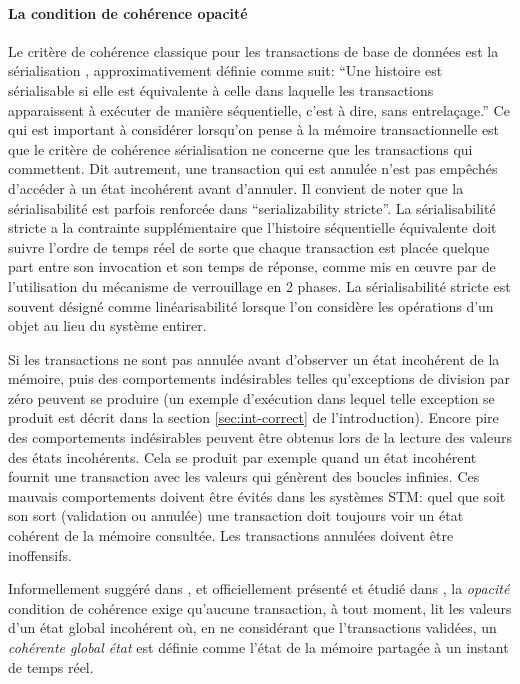 \paragraph {La condition de cohérence opacité}
Le critère de cohérence classique pour les transactions de base de données est la sérialisation \cite{P79}, approximativement définie comme suit:
``Une histoire est sérialisable si elle est équivalente à celle dans laquelle les transactions apparaissent à exécuter de manière séquentielle, c'est à dire, sans entrelaçage.''
Ce qui est important à considérer lorsqu'on pense à la mémoire transactionnelle est que le critère de cohérence sérialisation ne concerne que les transactions qui commettent.
Dit autrement, une transaction qui est annulée n'est pas empêchés d'accéder à un état incohérent avant d'annuler.
Il convient de noter que la sérialisabilité est parfois renforcée dans ``serializability stricte''.
La sérialisabilité stricte a la contrainte supplémentaire que l'histoire séquentielle équivalente doit suivre l'ordre de temps réel
de sorte que chaque transaction est placée quelque part entre son invocation et son temps de réponse, comme mis en œuvre par de l'utilisation du mécanisme de verrouillage en 2 phases.
La sérialisabilité stricte est souvent désigné comme linéarisabilité \cite{HW90} lorsque l'on considère les opérations d'un objet au lieu du système entirer.


Si les transactions ne sont pas annulée avant d'observer un état incohérent de la mémoire,
puis des comportements indésirables telles qu'exceptions de division par zéro peuvent se produire
(un exemple d'exécution dans lequel telle exception se produit est décrit dans la section \ref{sec:int-correct} de l'introduction).
Encore pire des comportements indésirables peuvent être obtenus lors de la lecture des valeurs des états incohérents.
Cela se produit par exemple quand un état incohérent fournit une transaction avec les valeurs qui génèrent des boucles infinies.
Ces mauvais comportements doivent être évités dans les systèmes STM:
quel que soit son sort (validation ou annulée) une transaction doit toujours voir un état cohérent de la mémoire consultée.
Les transactions annulées doivent être inoffensifs.




Informellement suggéré dans \cite{DSS06}, et officiellement présenté et étudié dans \cite{GK08},
la {\it opacité} condition de cohérence exige qu'aucune transaction, à tout moment, lit les valeurs d'un état global incohérent où,
en ne considérant que l'transactions validées, un {\it cohérente global état} est définie comme l'état de la mémoire partagée à un instant de temps réel.





